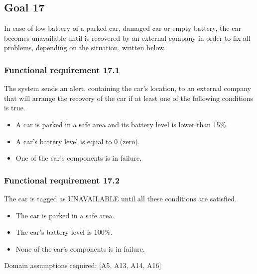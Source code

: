 \subsection{Goal 17}
In case of low battery of a parked car, damaged car or empty battery, the car becomes unavailable until is recovered by an external company in order to fix all problems, depending on the situation, written below. 

\setcounter{secnumdepth}{3}
\subsubsection{Functional requirement 17.1}
The system sends an alert, containing the car's location, to an external company that will arrange the recovery of the car if at least one of the following conditions is true.

\begin{itemize}
	\item A car is parked in a safe area and its battery level is lower than 15\%.
	\item A car's battery level is equal to 0 (zero).
	\item One of the car's components is in failure.
\end{itemize}

\subsubsection{Functional requirement 17.2}
The car is tagged as UNAVAILABLE until all these conditions are satisfied.

\begin{itemize}
	\item The car is parked in a safe area.
	\item The car's battery level is 100\%.
	\item None of the car's components is in failure.
\end{itemize}

\noindent Domain assumptions required: [A5, A13, A14, A16]
